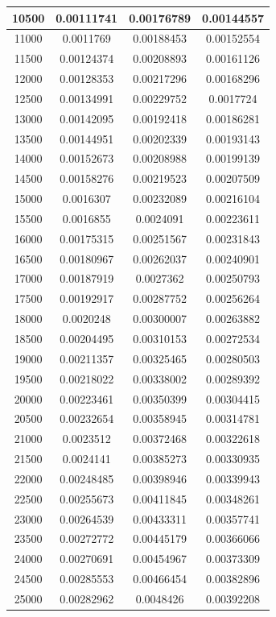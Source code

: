 \documentclass{article}
\begin{document}
\begin{longtable}{|c|c|c|c|}
			10500	 &  0.00111741	 &  0.00176789	 &  0.00144557  \\ \hline
			11000	 &  0.0011769	 &  0.00188453	 &  0.00152554  \\ \hline
			11500	 &  0.00124374	 &  0.00208893	 &  0.00161126  \\ \hline
			12000	 &  0.00128353	 &  0.00217296	 &  0.00168296  \\ \hline
			12500	 &  0.00134991	 &  0.00229752	 &  0.0017724  \\ \hline
			13000	 &  0.00142095	 &  0.00192418	 &  0.00186281  \\ \hline
			13500	 &  0.00144951	 &  0.00202339	 &  0.00193143  \\ \hline
			14000	 &  0.00152673	 &  0.00208988	 &  0.00199139  \\ \hline
			14500	 &  0.00158276	 &  0.00219523	 &  0.00207509  \\ \hline
			15000	 &  0.0016307	 &  0.00232089	 &  0.00216104  \\ \hline
			15500	 &  0.0016855	 &  0.0024091	 &  0.00223611  \\ \hline
			16000	 &  0.00175315	 &  0.00251567	 &  0.00231843  \\ \hline
			16500	 &  0.00180967	 &  0.00262037	 &  0.00240901  \\ \hline
			17000	 &  0.00187919	 &  0.0027362	 &  0.00250793  \\ \hline
			17500	 &  0.00192917	 &  0.00287752	 &  0.00256264  \\ \hline
			18000	 &  0.0020248	 &  0.00300007	 &  0.00263882  \\ \hline
			18500	 &  0.00204495	 &  0.00310153	 &  0.00272534  \\ \hline
			19000	 &  0.00211357	 &  0.00325465	 &  0.00280503  \\ \hline
			19500	 &  0.00218022	 &  0.00338002	 &  0.00289392  \\ \hline
			20000	 &  0.00223461	 &  0.00350399	 &  0.00304415  \\ \hline
			20500	 &  0.00232654	 &  0.00358945	 &  0.00314781  \\ \hline
			21000	 &  0.0023512	 &  0.00372468	 &  0.00322618  \\ \hline
			21500	 &  0.0024141	 &  0.00385273	 &  0.00330935  \\ \hline
			22000	 &  0.00248485	 &  0.00398946	 &  0.00339943  \\ \hline
			22500	 &  0.00255673	 &  0.00411845	 &  0.00348261  \\ \hline
			23000	 &  0.00264539	 &  0.00433311	 &  0.00357741  \\ \hline
			23500	 &  0.00272772	 &  0.00445179	 &  0.00366066  \\ \hline
			24000	 &  0.00270691	 &  0.00454967	 &  0.00373309  \\ \hline
			24500	 &  0.00285553	 &  0.00466454	 &  0.00382896  \\ \hline
			25000	 &  0.00282962	 &  0.0048426	 &  0.00392208  \\ \hline
		\end{longtable}
\end{document}
